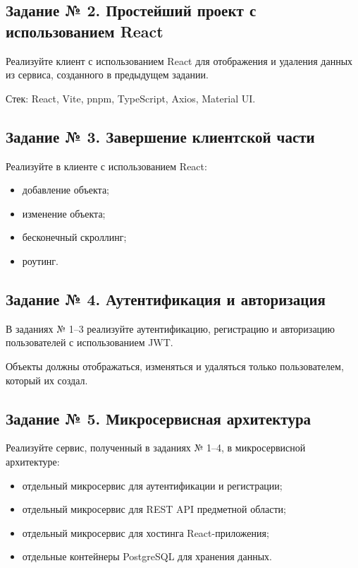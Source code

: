 \documentclass{article}
\begin{document}
\subsection{Задание № 2. Простейший проект с использованием React}

Реализуйте клиент с использованием React для отображения и удаления данных
из сервиса, созданного в предыдущем задании.

Стек: React, Vite, pnpm, TypeScript, Axios, Material UI.

\subsection{Задание № 3. Завершение клиентской части}

Реализуйте в клиенте с использованием React:

\begin{itemize}
    \item добавление объекта;
    \item изменение объекта;
    \item бесконечный скроллинг;
    \item роутинг.
\end{itemize}

\subsection{Задание № 4. Аутентификация и авторизация}

В заданиях № 1--3 реализуйте аутентификацию, регистрацию и авторизацию
пользователей с использованием JWT.

Объекты должны отображаться, изменяться и удаляться только пользователем,
который их создал.

\subsection{Задание № 5. Микросервисная архитектура}

Реализуйте сервис, полученный в заданиях № 1--4, в микросервисной архитектуре:

\begin{itemize}
    \item отдельный микросервис для аутентификации и регистрации;
    \item отдельный микросервис для REST API предметной области;
    \item отдельный микросервис для хостинга React-приложения;
    \item отдельные контейнеры PostgreSQL для хранения данных.
\end{itemize}
\end{document}
